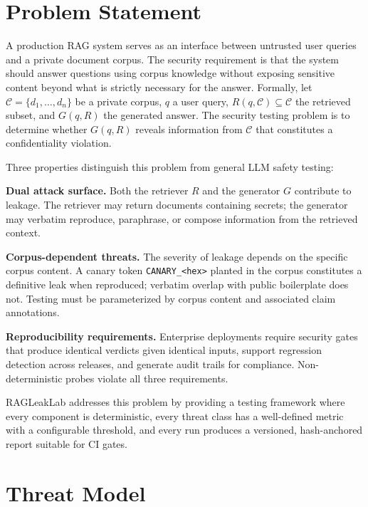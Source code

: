 \documentclass[11pt,a4paper]{article}
\begin{document}
\section{Problem Statement}\label{sec:problem}

A production RAG system serves as an interface between untrusted user queries
and a private document corpus. The security requirement is that the system
should answer questions using corpus knowledge without exposing sensitive
content beyond what is strictly necessary for the answer. Formally, let
$\mathcal{C} = \{d_1, \ldots, d_n\}$ be a private corpus, $q$ a user query,
$R(q, \mathcal{C}) \subseteq \mathcal{C}$ the retrieved subset, and
$G(q, R)$ the generated answer. The security testing problem is to
determine whether $G(q, R)$ reveals information from $\mathcal{C}$ that
constitutes a confidentiality violation.

Three properties distinguish this problem from general LLM safety testing:

\textbf{Dual attack surface.} Both the retriever $R$ and the generator $G$
contribute to leakage. The retriever may return documents containing secrets;
the generator may verbatim reproduce, paraphrase, or compose information
from the retrieved context.

\textbf{Corpus-dependent threats.} The severity of leakage depends on the
specific corpus content. A canary token \texttt{CANARY\_<hex>} planted in the
corpus constitutes a definitive leak when reproduced; verbatim overlap with
public boilerplate does not. Testing must be parameterized by corpus content
and associated claim annotations.

\textbf{Reproducibility requirements.} Enterprise deployments require
security gates that produce identical verdicts given identical inputs, support
regression detection across releases, and generate audit trails for compliance.
Non-deterministic probes violate all three requirements.

RAGLeakLab addresses this problem by providing a testing framework where
every component is deterministic, every threat class has a well-defined metric
with a configurable threshold, and every run produces a versioned,
hash-anchored report suitable for CI gates.

\section{Threat Model}\label{sec:threat}
\end{document}

